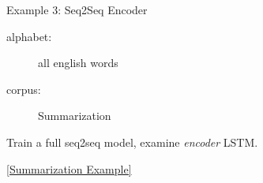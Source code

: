 \documentclass{beamer}
\let\tempone\itemize
\let\temptwo\enditemize
\renewenvironment{itemize}{\tempone\addtolength{\itemsep}{0.5\baselineskip}}{\temptwo}
\newcommand{\air}{\vspace{0.25cm}}
\begin{document}
\begin{frame}
  \centerline{\alert{Example 3}: Seq2Seq Encoder}
  \air

  \begin{description}
  \item[alphabet:] all english words
  \item[corpus:]  Summarization
  \end{description}

  \begin{itemize}

  \item Train a full seq2seq model, examine \textit{encoder} LSTM.
  
  \end{itemize}


\air
  \centerline{ \href{http://lstm.seas.harvard.edu/client/pattern_finder.html?data_set=20autoencoder&source=states::states2&pos=100}{[Summarization Example]}}
\end{frame}



      

\end{document}
